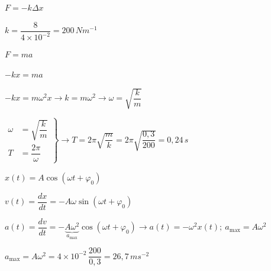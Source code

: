 \begin{solapartat}
 $F = -k\Delta x$

\smallskip
{} $k = \dfrac{8}{4\times 10^{-2}} = 200\,Nm^{-1}$

\medskip
{} $F = ma$

\smallskip
{} $-kx = ma$

\smallskip
{} $-kx = m\omega^2 x \rightarrow k = m\omega^2 \rightarrow \omega = \sqrt{\dfrac{k}{m}}$

\medskip
{} $\left.\begin{aligned} \omega &= \sqrt{\dfrac{k}{m}}\\[2pt] T &= \dfrac{2\pi}{\omega} \end{aligned}\right\} \rightarrow T = 2\pi\sqrt{\dfrac{m}{k}} = 2\pi\sqrt{\dfrac{0,3}{200}} = 0,24\,s$
\end{solapartat}

\begin{solapartat}
 $x(t) = A\cos(\omega t + \varphi_0)$

\smallskip
{} $v(t) = \dfrac{dx}{dt} = -A\omega\sin(\omega t + \varphi_0)$

\smallskip
{} $a(t) = \dfrac{dv}{dt} = -\underbrace{A\omega^2}_{a_{\max}}\cos(\omega t + \varphi_0) \rightarrow a(t) = -\omega^2 x(t);\ a_{\max} = A\omega^2$

\medskip
{} $a_{\max} = A\omega^2 = 4\times 10^{-2}\,\dfrac{200}{0,3} = 26,7\,ms^{-2}$
\end{solapartat}
